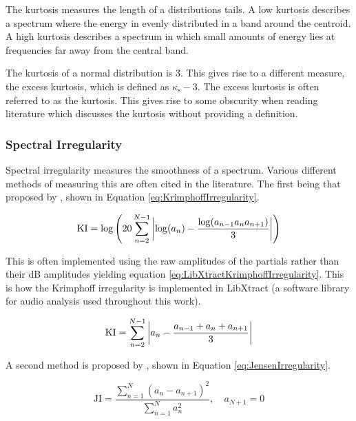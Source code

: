 			The kurtosis measures the length of a distributions tails. A low kurtosis describes a spectrum where
			the energy in evenly distributed in a band around the centroid. A high kurtosis describes a spectrum
			in which small amounts of energy lies at frequencies far away from the central band.

			The kurtosis of a normal distribution is 3. This gives rise to a different measure, the excess
			kurtosis, which is defined as $\kappa_{\textrm{s}} - 3$. The excess kurtosis is often referred to as
			the kurtosis. This gives rise to some obscurity when reading literature which discusses the kurtosis
			without providing a definition.

		\subsubsection*{Spectral Irregularity}
			Spectral irregularity measures the smoothness of a spectrum. Various different methods of measuring
			this are often cited in the literature. The first being that proposed by
			\citet{krimphoff1994caracterisation}, shown in Equation \ref{eq:KrimphoffIrregularity}.

			\begin{equation}
				\textrm{KI} = \log \left( 20 \sum_{n = 2}^{N - 1}
							  \left|\log(a_{n}) - \frac{\log(a_{n-1}a_{n}a_{n+1})}{3}\right|
						   \right)
				\label{eq:KrimphoffIrregularity}
			\end{equation}

			This is often implemented using the raw amplitudes of the partials rather than their dB amplitudes
			yielding equation \ref{eq:LibXtractKrimphoffIrregularity}. This is how the Krimphoff irregularity is
			implemented in LibXtract \citep{bullock2007libxtract} (a software library for audio analysis used
			throughout this work).

			\begin{equation}
				\textrm{KI} = \sum_{n = 2}^{N - 1}
						  \left|a_{n} - \frac{a_{n-1} + a_{n} + a_{n+1}}{3}\right|
				\label{eq:LibXtractKrimphoffIrregularity}
			\end{equation}

			A second method is proposed by \citet{jensen1999timbre}, shown in Equation
			\ref{eq:JensenIrregularity}.

			\begin{equation}
				\textrm{JI} = \frac{\sum_{n = 1}^{N} (a_{n} - a_{n+1})^{2}}
						   {\sum_{n = 1}^{N} a_{n}^{2}},
					      \quad a_{N+1} = 0
				\label{eq:JensenIrregularity}
			\end{equation}

